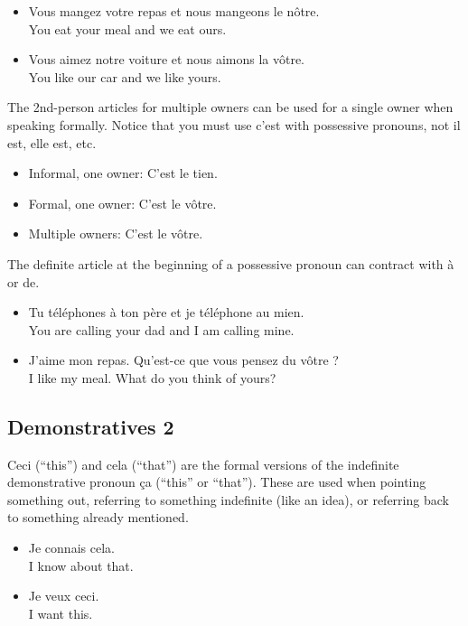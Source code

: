 \begin{itemize}
  \item  Vous mangez votre repas et nous mangeons le n{\^o}tre. \\ You eat your meal and we eat ours.
  \item  Vous aimez notre voiture et nous aimons la v{\^o}tre. \\ You like our car and we like yours. 
\end{itemize}

The 2nd-person articles for multiple owners can be used for a single owner when speaking formally.  Notice that you must use c'est with possessive pronouns, not il est, elle est, etc.

\begin{itemize}
  \item  Informal, one owner: C'est le tien.
  \item  Formal, one owner: C'est le v{\^o}tre.
  \item  Multiple owners: C'est le v{\^o}tre.
\end{itemize}

The definite article at the beginning of a possessive pronoun can contract with à or de.

\begin{itemize}
  \item  Tu t{\'e}l{\'e}phones {\`a} ton p{\`e}re et je t{\'e}l{\'e}phone au mien. \\ You are calling your dad and I am calling mine.
  \item  J'aime mon repas. Qu'est-ce que vous pensez du v{\^o}tre ? \\ I like my meal. What do you think of yours?
\end{itemize}


\pagebreak
\subsection{Demonstratives 2}

Ceci (``this'') and cela (``that'') are the formal versions of the indefinite demonstrative pronoun {\c c}a (``this'' or ``that''). These are used when pointing something out, referring to something indefinite (like an idea), or referring back to something already mentioned.

\begin{itemize}
  \item  Je connais cela. \\ I know about that.
  \item  Je veux ceci. \\ I want this.
\end{itemize}


